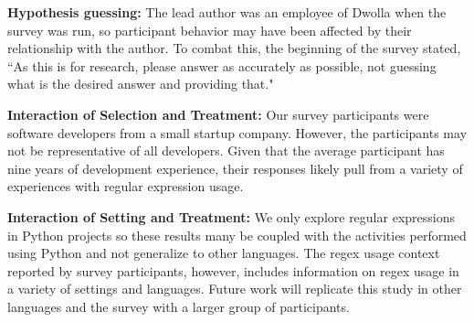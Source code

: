 \documentclass{sig-alternate-05-2015}
\begin{document}

\textbf{Hypothesis guessing:} The lead author was an employee of Dwolla when the survey was run, so participant behavior may have been affected by their relationship with the author. To combat this, the beginning of the survey stated, ``As this is for research, please answer as accurately as possible, not guessing what is the desired answer and providing that."


\textbf{Interaction of Selection and Treatment:} Our survey participants were software developers from a small startup company. However, the participants may not be representative of all developers. Given that the average participant has nine years of development experience, their responses likely pull from a variety of experiences with regular expression usage.

\textbf{Interaction of Setting and Treatment:}
We only explore regular expressions in Python projects so these results many be coupled with the activities performed using Python and not generalize to other languages. The regex usage context reported by survey participants, however, includes information on  regex usage in a  variety of settings and languages. Future work will replicate this study in other languages and the survey with a larger group of participants.



%
%
%
\end{document}
